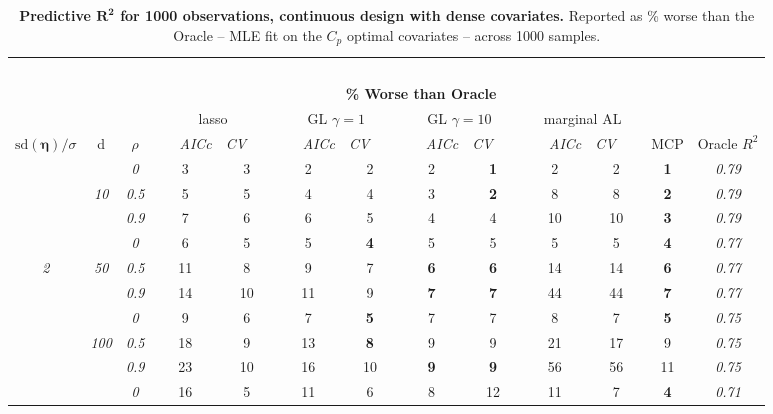 \begin{table}
\vspace{-.2cm}
\footnotesize
\caption{ 
	{\bf  Predictive $\boldsymbol{R^2}$ for 1000 observations, 
	continuous design with dense covariates.}
  Reported as  \% worse than the Oracle 
  -- MLE fit on the $C_p$ optimal covariates -- 
  across 1000 samples.}
\begin{center}
\begin{tabular}{ccc|cc|cc|cc|cc|c|c}
\hline &&&\multicolumn{9}{|c|}{~}\\[-1ex]
\multicolumn{3}{c}{~}&\multicolumn{9}{|c|}{\bf \% Worse than Oracle } &   \\[1ex]
& &
& \multicolumn{2}{c}{lasso} 
& \multicolumn{2}{c}{GL $\gamma=1$} 
& \multicolumn{2}{c}{GL $\gamma=10$} 
& \multicolumn{2}{c}{marginal AL} 
& \multicolumn{1}{c|}{~} & \\[-0.5ex]
$\mathrm{sd}(\boldsymbol{\eta})/\sigma$ & {\sf d} & $\rho$ 
& ~~~\scriptsize\it AICc & \multicolumn{1}{c}{\scriptsize\it CV~~~}
& ~~~\scriptsize\it AICc & \multicolumn{1}{c}{\scriptsize\it CV~~~}
& ~~~\scriptsize\it AICc & \multicolumn{1}{c}{\scriptsize\it CV~~~}
& ~~~\scriptsize\it AICc & \multicolumn{1}{c}{\scriptsize\it CV~~~} 
& \multicolumn{1}{c|}{ MCP} & Oracle $R^2$ \\[.5ex]
\hline\rule{0pt}{3ex}
& & \it  0  & 3 & 3 & 2 & 2 & 2 & {\bf 1} & 2 & 2 & {\bf 1} & \it  0.79 \\
 & \it  10  & \it  0.5  & 5 & 5 & 4 & 4 & 3 & {\bf 2} & 8 & 8 & {\bf 2} & \it  0.79 \\
& & \it  0.9  & 7 & 6 & 6 & 5 & 4 & 4 & 10 & 10 & {\bf 3} & \it  0.79 \\[1ex]
\cline{2-3}\rule{0pt}{3ex}
& & \it  0  & 6 & 5 & 5 & {\bf 4} & 5 & 5 & 5 & 5 & {\bf 4} & \it  0.77 \\
\it  2  & \it  50  & \it  0.5  & 11 & 8 & 9 & 7 & {\bf 6} & {\bf 6} & 14 & 14 & {\bf 6} & \it  0.77 \\
& & \it  0.9  & 14 & 10 & 11 & 9 & {\bf 7} & {\bf 7} & 44 & 44 & {\bf 7} & \it  0.77 \\[1ex]
\cline{2-3}\rule{0pt}{3ex}
& & \it  0  & 9 & 6 & 7 & {\bf 5} & 7 & 7 & 8 & 7 & {\bf 5} & \it  0.75 \\
 & \it  100  & \it  0.5  & 18 & 9 & 13 & {\bf 8} & 9 & 9 & 21 & 17 & 9 & \it  0.75 \\
& & \it  0.9  & 23 & 10 & 16 & 10 & {\bf 9} & {\bf 9} & 56 & 56 & 11 & \it  0.75 \\[1ex]
\cline{2-3}\rule{0pt}{3ex}
& & \it  0  & 16 & 5 & 11 & 6 & 8 & 12 & 11 & 7 & {\bf 4} & \it  0.71 \\

\end{tabular}
\end{center}
\end{table}
